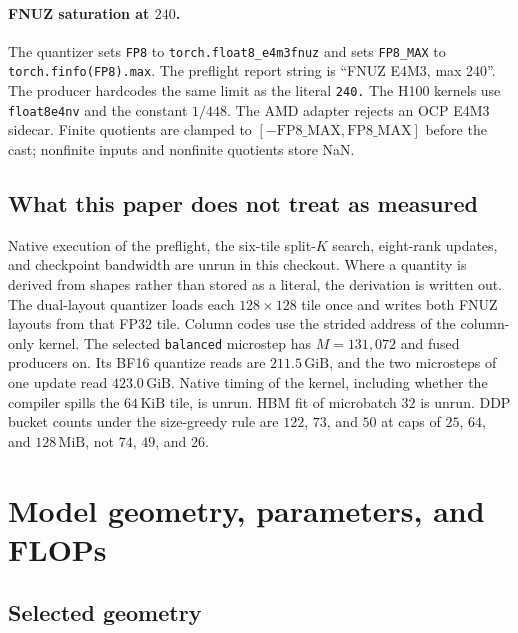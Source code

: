 \documentclass[11pt]{article}
\DeclareRobustCommand{\code}[1]{\texttt{#1}}
\newcommand{\MiB}{\,\mathrm{MiB}}
\newcommand{\GiB}{\,\mathrm{GiB}}
\begin{document}
\paragraph{FNUZ saturation at \(240\).}
The quantizer sets \code{FP8} to \code{torch.float8\_e4m3fnuz} and sets
\code{FP8\_MAX} to \code{torch.finfo(FP8).max}. The preflight report string is
``FNUZ E4M3, max 240''. The producer hardcodes the same limit as the literal
\code{240.} The H100 kernels use \code{float8e4nv} and the constant
\(1/448\). The AMD adapter rejects an OCP E4M3 sidecar. Finite quotients are
clamped to \([-\mathrm{FP8\_MAX},\mathrm{FP8\_MAX}]\) before the cast;
nonfinite inputs and nonfinite quotients store NaN.

\subsection{What this paper does not treat as measured}

Native execution of the preflight, the six-tile split-\(K\) search, eight-rank
updates, and checkpoint bandwidth are unrun in this checkout. Where a
quantity is derived from shapes rather than stored as a literal, the
derivation is written out. The dual-layout quantizer loads each
\(128\times 128\) tile once and writes both FNUZ layouts from that FP32 tile.
Column codes use the strided address of the column-only kernel. The selected
\code{balanced} microstep has \(M=131{,}072\) and fused producers on. Its
BF16 quantize reads are \(211.5\GiB\), and the two microsteps of one update
read \(423.0\GiB\). Native timing of the kernel, including whether the
compiler spills the \(64\,\mathrm{KiB}\) tile, is unrun. HBM fit of
microbatch \(32\) is unrun. DDP bucket counts under the
size-greedy rule are \(122\), \(73\), and \(50\) at caps of \(25\), \(64\),
and \(128\MiB\), not \(74\), \(49\), and \(26\).

\section{Model geometry, parameters, and FLOPs}

\subsection{Selected geometry}
\end{document}
